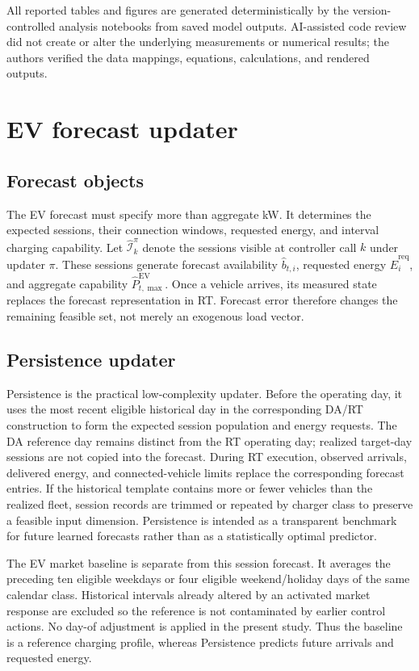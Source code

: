 \documentclass[final,5p,times]{elsarticle}
\newcommand{\EV}{\mathrm{EV}}
\newcommand{\req}{\mathrm{req}}
\begin{document}
All reported tables and figures are generated deterministically by the
version-controlled analysis notebooks from saved model outputs. AI-assisted
code review did not create or alter the underlying measurements or numerical
results; the authors verified the data mappings, equations, calculations, and
rendered outputs.

\section{EV forecast updater}
\label{sec:forecasting}

\subsection{Forecast objects}
The EV forecast must specify more than aggregate kW. It determines the expected sessions, their connection windows, requested energy, and interval charging capability. Let $\widehat{\mathcal I}_{k}^{\pi}$ denote the sessions visible at controller call $k$ under updater $\pi$. These sessions generate forecast availability $\widehat b_{t,i}$, requested energy $\widehat E_i^{\req}$, and aggregate capability $\widehat P_{t,\max}^{\EV}$. Once a vehicle arrives, its measured state replaces the forecast representation in RT. Forecast error therefore changes the remaining feasible set, not merely an exogenous load vector.

\subsection{Persistence updater}
Persistence is the practical low-complexity updater. Before the operating day, it uses the most recent eligible historical day in the corresponding DA/RT construction to form the expected session population and energy requests. The DA reference day remains distinct from the RT operating day; realized target-day sessions are not copied into the forecast. During RT execution, observed arrivals, delivered energy, and connected-vehicle limits replace the corresponding forecast entries. If the historical template contains more or fewer vehicles than the realized fleet, session records are trimmed or repeated by charger class to preserve a feasible input dimension. Persistence is intended as a transparent benchmark for future learned forecasts rather than as a statistically optimal predictor.

The EV market baseline is separate from this session forecast. It averages the preceding ten eligible weekdays or four eligible weekend/holiday days of the same calendar class. Historical intervals already altered by an activated market response are excluded so the reference is not contaminated by earlier control actions. No day-of adjustment is applied in the present study. Thus the baseline is a reference charging profile, whereas Persistence predicts future arrivals and requested energy.
\end{document}
